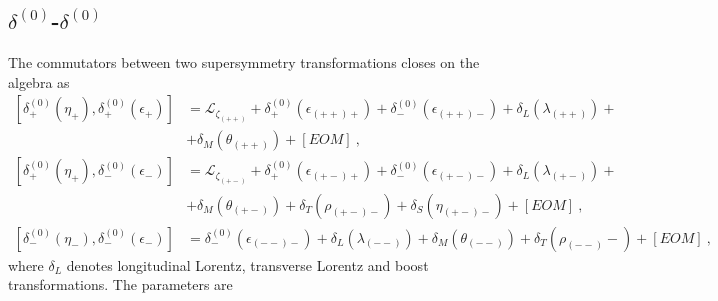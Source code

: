 \documentclass[a4paper,10pt,openany]{article}
\begin{document}
	\subsection[$\delta^{(0)}$-$\delta^{(0)}$]{\boldmath$\delta^{(0)}$-$\delta^{(0)}$}
	The commutators between two supersymmetry transformations closes on the algebra as
	\begin{subequations}
		\begin{align}
			[\delta_{+}^{(0)}(\eta_{+}),\delta_{+}^{(0)}(\epsilon_{+})]&=\mathcal{L}_{\zeta_{(++)}}+\delta_{+}^{(0)}(\epsilon_{(++)+})+\delta_{-}^{(0)}(\epsilon_{(++)-})+\delta_{L}(\lambda_{(++)})+\nonumber\\
			&+\delta_{M}(\theta_{(++)})+[EOM]\ , \label{eq:commutatorQ+Q+2}\\
			[\delta_{+}^{(0)}(\eta_{+}),\delta_{-}^{(0)}(\epsilon_{-})]&=\mathcal{L}_{\zeta_{(+-)}}+\delta_{+}^{(0)}(\epsilon_{(+-)+})+\delta_{-}^{(0)}(\epsilon_{(+-)-})+\delta_{L}(\lambda_{(+-)})+\nonumber\\
			&+\delta_{M}(\theta_{(+-)})+\delta_{T}(\rho_{(+-)-})+\delta_{S}(\eta_{(+-)-})+[EOM]\ , \label{eq:commutatorQ+Q-2}\\
			[\delta_{-}^{(0)}(\eta_{-}),\delta_{-}^{(0)}(\epsilon_{-})]&=\delta_{-}^{(0)}(\epsilon_{(--)-})+\delta_{L}(\lambda_{(--)})+\delta_{M}(\theta_{(--)})+\delta_{T}(\rho_{(--)}-)+[EOM]\ , \label{eq:commutatorQ-Q-2}
		\end{align}
	\end{subequations}
	where $\delta_{L}$ denotes longitudinal Lorentz, transverse Lorentz and boost transformations. The parameters are
\end{document}
